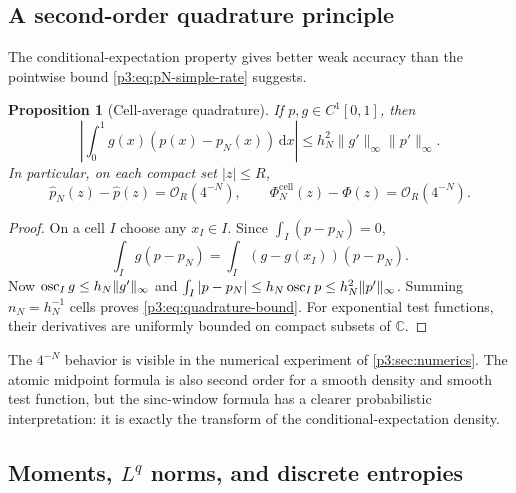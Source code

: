 \documentclass[11pt]{article}
\newtheorem{proposition}[theorem]{Proposition}
\theoremstyle{definition}
\theoremstyle{remark}
\newcommand{\C}{\mathbb C}
\newcommand{\dd}{\,\mathrm d}
\newcommand{\bigO}{\mathcal O}
\begin{document}
\subsection{A second-order quadrature principle}

The conditional-expectation property gives better weak accuracy than the
pointwise bound \eqref{p3:eq:pN-simple-rate} suggests.

\begin{proposition}[Cell-average quadrature]
\label{p3:prop:cell-quadrature}
If $p,g\in C^1[0,1]$, then
\begin{equation}\label{p3:eq:quadrature-bound}
 \left|\int_0^1g(x)(p(x)-p_N(x))\dd x\right|
 \le h_N^2\|g'\|_\infty\|p'\|_\infty.
\end{equation}
In particular, on each compact set $|z|\le R$,
\begin{equation}\label{p3:eq:transform-O4N}
 \widehat p_N(z)-\widehat p(z)=\bigO_R(4^{-N}),
 \qquad
 \Phi_N^{\mathrm{cell}}(z)-\Phi(z)=\bigO_R(4^{-N}).
\end{equation}
\end{proposition}

\begin{proof}
On a cell $I$ choose any $x_I\in I$.  Since
$\int_I(p-p_N)=0$,
\[
 \int_Ig(p-p_N)=\int_I(g-g(x_I))(p-p_N).
\]
Now $\operatorname{osc}_Ig\le h_N\|g'\|_\infty$ and
$\int_I|p-p_N|\le h_N\operatorname{osc}_Ip\le h_N^2\|p'\|_\infty$.
Summing $n_N=h_N^{-1}$ cells proves \eqref{p3:eq:quadrature-bound}.
For exponential test functions, their derivatives are uniformly bounded on
compact subsets of $\C$.
\end{proof}

The $4^{-N}$ behavior is visible in the numerical experiment of
\cref{p3:sec:numerics}.  The atomic midpoint formula is also second order for a
smooth density and smooth test function, but the sinc-window formula has a
clearer probabilistic interpretation: it is exactly the transform of the
conditional-expectation density.

\subsection{Moments, $L^q$ norms, and discrete entropies}
\end{document}
